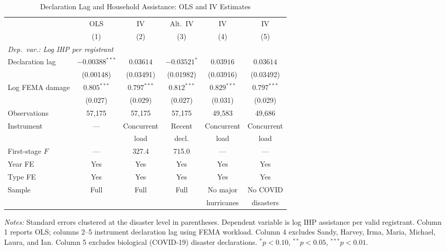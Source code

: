 \begin{table}[t]
\centering
\caption{Declaration Lag and Household Assistance: OLS and IV Estimates}
\label{tab:main}
\begin{tabular}{lccccc}
\toprule
 & OLS & IV & Alt.~IV & IV & IV \\
 & (1) & (2) & (3) & (4) & (5) \\
\midrule
\multicolumn{6}{l}{\textit{Dep.~var.: Log IHP per registrant}} \\[3pt]
Declaration lag & $-0.00388^{***}$ & $0.03614$ & $-0.03521^{*}$ & $0.03916$ & $0.03614$ \\
 & (0.00148) & (0.03491) & (0.01982) & (0.03916) & (0.03492) \\
\addlinespace
Log FEMA damage & $0.805^{***}$ & $0.797^{***}$ & $0.812^{***}$ & $0.829^{***}$ & $0.797^{***}$ \\
 & (0.027) & (0.029) & (0.027) & (0.031) & (0.029) \\
\midrule
Observations & 57,175 & 57,175 & 57,175 & 49,583 & 49,686 \\
Instrument & --- & Concurrent & Recent & Concurrent & Concurrent \\
 & & load & decl. & load & load \\
First-stage $F$ & --- & 327.4 & 715.0 & --- & --- \\
Year FE & Yes & Yes & Yes & Yes & Yes \\
Type FE & Yes & Yes & Yes & Yes & Yes \\
Sample & Full & Full & Full & No major & No COVID \\
 & & & & hurricanes & disasters \\
\bottomrule
\end{tabular}
\begin{tablenotes}[flushleft]
\small
\item \textit{Notes:} Standard errors clustered at the disaster level in parentheses.
Dependent variable is log IHP assistance per valid registrant.
Column 1 reports OLS; columns 2--5 instrument declaration lag using FEMA workload.
Column 4 excludes Sandy, Harvey, Irma, Maria, Michael, Laura, and Ian.
Column 5 excludes biological (COVID-19) disaster declarations.
$^{*} p < 0.10$, $^{**} p < 0.05$, $^{***} p < 0.01$.
\end{tablenotes}
\end{table}
